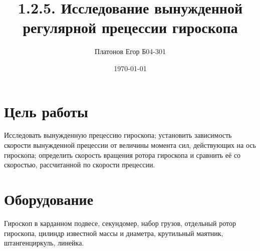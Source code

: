 \documentclass[a4paper, 12pt]{article}
\title{1.2.5. Исследование вынужденной регулярной прецессии гироскопа}
\author{Платонов Егор Б04-301}
\date{\today}
\begin{document}
\maketitle

\section*{Цель работы}
Исследовать вынужденную прецессию гироскопа; установить зависимость скорости вынужденной прецессии от величины момента сил, действующих на ось гироскопа; определить скорость вращения ротора гироскопа и сравнить её со скоростью, рассчитанной по скорости прецессии.
	\section*{Оборудование}
		Гироскоп в карданном подвесе, секундомер, набор грузов, отдельный ротор гироскопа, цилиндр известной массы и диаметра, крутильный маятник, штангенциркуль, линейка.
\end{document}

